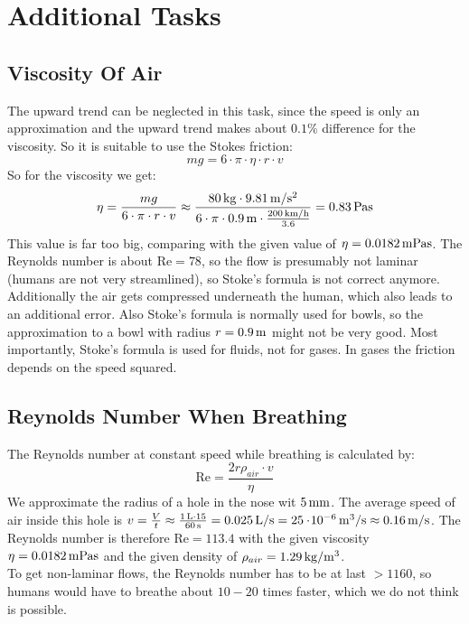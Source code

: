 \section{Additional Tasks}
\subsection{Viscosity Of Air}
The upward trend can be neglected in this task, since the speed is only an approximation and the upward trend makes about $0.1\%$ difference for the viscosity. So it is suitable to use the Stokes friction:
\begin{equation*}
mg = 6 \cdot \pi \cdot \eta \cdot r \cdot v
\end{equation*}
So for the viscosity we get:
\begin{equation}
\eta = \frac{mg}{6 \cdot \pi \cdot r \cdot v} \approx \frac{\unit[80]{kg}\cdot \unit[9.81]{m/s^2}}{6 \cdot \pi \cdot \unit[0.9]{m} \cdot \frac{\unit[200]{km/h}}{3.6}} = \unit[0.83]{Pa s}
\end{equation}
This value is far too big, comparing with the given value of $\eta = \unit[0.0182]{mPa s}$. The Reynolds number is about $\text{Re} = 78$, so the flow is presumably not laminar (humans are not very streamlined), so Stoke's formula is not correct anymore. Additionally the air gets compressed underneath the human, which also leads to an additional error. Also Stoke's formula is normally used for bowls, so the approximation to a bowl with radius $r = \unit[0.9]{m}$ might not be very good. Most importantly, Stoke's formula is used for fluids, not for gases. In gases the friction depends on the speed squared.



\subsection{Reynolds Number When Breathing}
The Reynolds number at constant speed while breathing is calculated by:
\begin{equation}
\text{Re} = \frac{2r \rho_{air} \cdot v}{\eta}
\end{equation}
We approximate the radius of a hole in the nose wit $\unit[5]{mm}$. The average speed of air inside this hole is $v = \frac{V}{t} \approx \frac{\unit[1]{L} \cdot 15}{\unit[60]{s}} = \unit[0.025]{L/s} = \unit[25\e{-6}]{m^3/s} \approx \unit[0.16]{m/s}$. The Reynolds number is therefore $\text{Re} = 113.4$ with the given viscosity $\eta = \unit[0.0182]{mPa s}$ and the given density of $\rho_{air} = \unit[1.29]{kg/m^3}$.\\
To get non-laminar flows, the Reynolds number has to be at last $>1160$, so humans would have to breathe about $10-20$ times faster, which we do not think is possible.